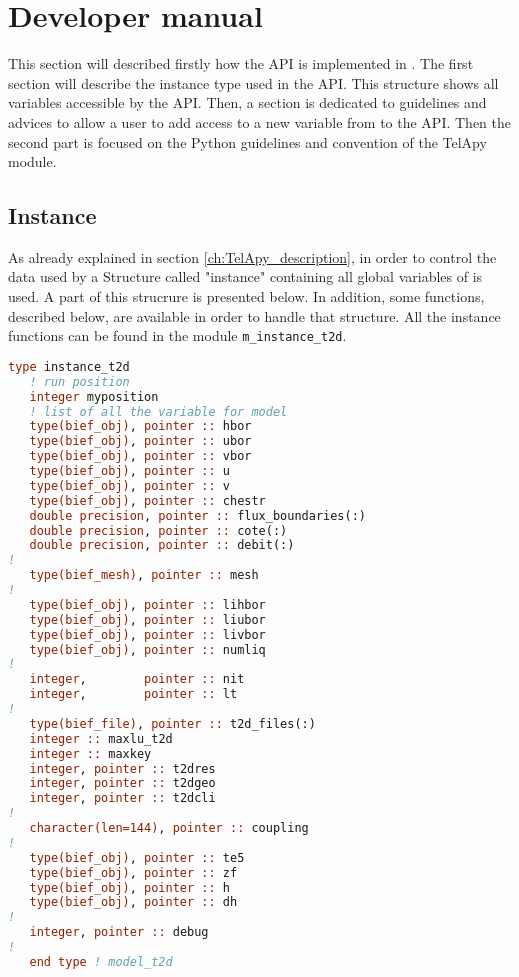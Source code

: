 \chapter{Developer manual}
\label{ch:hydrod:sim}

This section will described firstly how the API is implemented in \fortran.
The first section will describe the instance type used in the API. This
structure shows all variables accessible by the \fortran API. Then, a
section is dedicated to guidelines and advices to allow a user to add access to
a new variable from  to the API.
Then the second part is focused on the Python guidelines and convention 
of the TelApy module.
%
\section{Instance}
%
As already explained in section \ref{ch:TelApy_description}, in order to
control the data used by  a \fortran Structure called "instance" containing all global variables of  is used. A part of this strucrure is presented below.
In addition, some functions, described below, are available in order to handle
that structure. All the instance functions can be found in the module
\verb!m_instance_t2d!.

\begin{lstlisting}[language=Fortran]
type instance_t2d
   ! run position
   integer myposition
   ! list of all the variable for model
   type(bief_obj), pointer :: hbor
   type(bief_obj), pointer :: ubor
   type(bief_obj), pointer :: vbor
   type(bief_obj), pointer :: u
   type(bief_obj), pointer :: v
   type(bief_obj), pointer :: chestr
   double precision, pointer :: flux_boundaries(:)
   double precision, pointer :: cote(:)
   double precision, pointer :: debit(:)
!
   type(bief_mesh), pointer :: mesh
!
   type(bief_obj), pointer :: lihbor
   type(bief_obj), pointer :: liubor
   type(bief_obj), pointer :: livbor
   type(bief_obj), pointer :: numliq
!
   integer,        pointer :: nit
   integer,        pointer :: lt
!
   type(bief_file), pointer :: t2d_files(:)
   integer :: maxlu_t2d
   integer :: maxkey
   integer, pointer :: t2dres
   integer, pointer :: t2dgeo
   integer, pointer :: t2dcli
!
   character(len=144), pointer :: coupling
!
   type(bief_obj), pointer :: te5
   type(bief_obj), pointer :: zf
   type(bief_obj), pointer :: h
   type(bief_obj), pointer :: dh
!
   integer, pointer :: debug
!
   end type ! model_t2d
\end{lstlisting}

